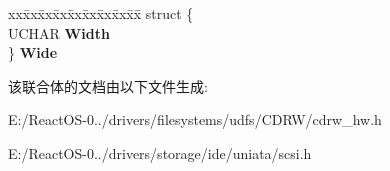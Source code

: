 \begin{DoxyCompactItemize}
\begin{tabbing}
\end{tabbing}\item 
\mbox{\label{union___s_c_s_i___e_x_t_e_n_d_e_d___m_e_s_s_a_g_e_1_1___e_x_t_e_n_d_e_d___a_r_g_u_m_e_n_t_s_a2d877cf7ac3d0a2ed54f73b626dd3273}} 
\begin{tabbing}
xx\=xx\=xx\=xx\=xx\=xx\=xx\=xx\=xx\=\kill
struct \{\\
\>UCHAR {\bfseries Width}\\
\} {\bfseries Wide}\\

\end{tabbing}\end{DoxyCompactItemize}


该联合体的文档由以下文件生成\+:\begin{DoxyCompactItemize}
\item 
E\+:/\+React\+O\+S-\/0../drivers/filesystems/udfs/\+C\+D\+R\+W/cdrw\+\_\+hw.\+h\item 
E\+:/\+React\+O\+S-\/0../drivers/storage/ide/uniata/scsi.\+h\end{DoxyCompactItemize}

